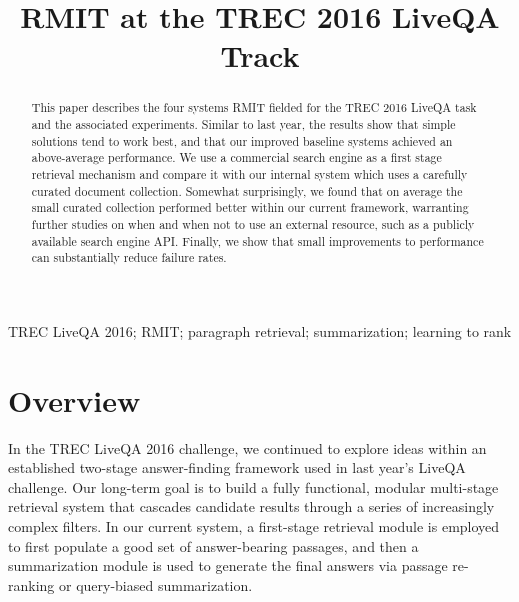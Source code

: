 \documentclass[a4paper,10pt,conference,compsocconf,final]{IEEEtran}
\newcommand{\opstyle}[1]{\mbox{\textsc{#1}}}
\begin{document}

\title{RMIT at the TREC 2016 LiveQA Track}
\author{
}

\maketitle

\begin{abstract} 
This paper describes the four systems RMIT fielded for the
{\opstyle{TREC}} 2016 LiveQA task and the associated experiments.
Similar to last year, the results show that simple solutions tend
to work best, and that our improved baseline systems achieved
an above-average performance.
We use a commercial search engine as a first stage retrieval
mechanism and compare it with our internal system which uses
a carefully curated document collection.
Somewhat surprisingly, we found that on average the small curated
collection performed better within our current framework, warranting
further studies on when and when not to use an external resource,
such as a publicly available search engine API.
Finally, we show that small improvements to performance can
substantially reduce failure rates.
\end{abstract}

\begin{IEEEkeywords} 
  \opstyle{TREC} LiveQA 2016; RMIT; paragraph retrieval; summarization; learning to rank
\end{IEEEkeywords}

\section{Overview}
\label{overview}

In the TREC LiveQA 2016 challenge, we continued to explore ideas
within an established two-stage answer-finding framework used in last
year's LiveQA challenge.
Our long-term goal is to build a fully functional, modular multi-stage
retrieval system that cascades candidate results through a series
of increasingly complex filters.
In our current system, a first-stage retrieval module is employed to
first populate a good set of answer-bearing passages, and then a
summarization module is used to generate the final answers via
passage re-ranking or query-biased summarization.
\end{document}
